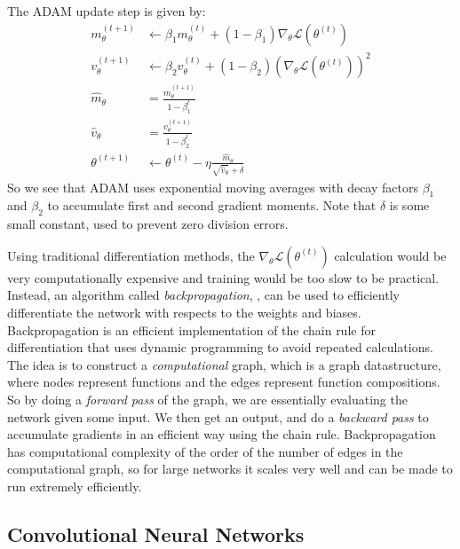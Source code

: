 \documentclass[a4paper, oneside, notitlepage]{book}
\begin{document}
The ADAM update step is given by:
\begin{equation}
    \begin{aligned}
        m_{\theta}^{(t+1)} &\leftarrow \beta _{1}m_{\theta}^{(t)}+\left(1-\beta _{1}\right)\nabla_{\theta} \mathcal{L}(\theta^{(t)}) \\
        v_{\theta}^{(t+1)} &\leftarrow \beta _{2}v_{\theta}^{(t)}+\left(1-\beta _{2}\right)\left(\nabla_{\theta} \mathcal{L}(\theta^{(t)})\right)^{2} \\
        {\hat {m}}_{\theta} &={\frac {m_{\theta}^{(t+1)}}{1-\beta _{1}^{t}}} \\
        {\hat {v}}_{\theta} &={\frac {v_{\theta}^{(t+1)}}{1-\beta _{2}^{t}}} \\
        \theta^{(t+1)} &\leftarrow \theta^{(t)}-\eta {\frac {{\hat {m}}_{\theta}}{{\sqrt {{\hat {v}}_{\theta}}}+\delta }}
    \end{aligned}
\end{equation}
So we see that ADAM uses exponential moving averages with decay factors $\beta_1$ and $\beta_2$ to accumulate first and
second gradient moments. Note that $\delta$ is some small constant, used to prevent zero division errors.

Using traditional differentiation methods, the $\nabla_\theta \mathcal{L}(\theta^{(t)})$ calculation would be very computationally
expensive and training would be too slow to be practical. Instead, an algorithm called \textit{backpropagation}, \cite{RUMELHART1986},
can be used to efficiently differentiate the network with respects to the weights and biases. 
Backpropagation is an efficient implementation of the chain rule for differentiation that uses
dynamic programming to avoid repeated calculations. The idea is to construct a \textit{computational} graph,
which is a graph datastructure, where nodes represent functions and the edges represent function compositions.
So by doing a \textit{forward pass} of the graph, we are essentially evaluating the network given some input.
We then get an output, and do a \textit{backward pass} to accumulate gradients in an efficient way using the chain rule.
Backpropagation has computational complexity of the order of the number of edges in the computational graph,
so for large networks it scales very well and can be made to run extremely efficiently.

\subsection{Convolutional Neural Networks}
\end{document}
